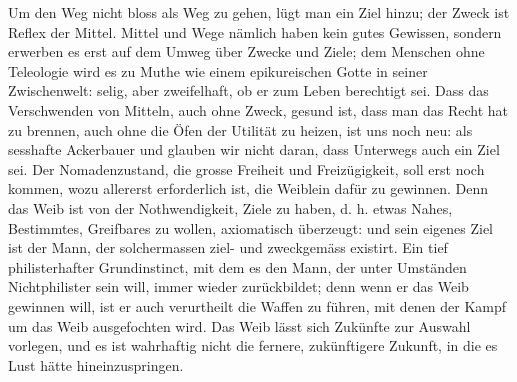 Um den Weg nicht bloss als Weg zu gehen, lügt man ein Ziel hinzu; der Zweck ist Reflex der Mittel. Mittel und Wege nämlich haben kein gutes Gewissen, sondern erwerben es erst auf dem Umweg über Zwecke und Ziele; dem Menschen ohne Teleologie wird es zu Muthe wie einem epikureischen Gotte in seiner Zwischenwelt: selig, aber zweifelhaft, ob er zum Leben berechtigt sei. Dass das Verschwenden von Mitteln, auch ohne Zweck, gesund ist, dass man das Recht hat zu brennen, auch ohne die Öfen der Utilität zu heizen, ist uns noch neu: als sesshafte Ackerbauer und  glauben wir nicht daran, dass Unterwegs auch ein Ziel sei. Der Nomadenzustand, die grosse Freiheit und Freizügigkeit, soll erst noch kommen, wozu allererst erforderlich ist, die Weiblein dafür zu gewinnen. Denn das Weib ist von der Nothwendigkeit, Ziele zu haben, d. h. etwas Nahes, Bestimmtes, Greifbares zu wollen, axiomatisch überzeugt: und sein eigenes Ziel ist der Mann, der solchermassen ziel- und zweckgemäss existirt. Ein tief philisterhafter Grundinstinct, mit dem es den Mann, der unter Umständen Nichtphilister sein will, immer wieder zurückbildet; denn wenn er das Weib gewinnen will, ist er auch verurtheilt die Waffen zu führen, mit denen der Kampf um das Weib ausgefochten wird. Das Weib lässt sich Zukünfte zur Auswahl vorlegen, und es ist wahrhaftig nicht die fernere, zukünftigere Zukunft, in die es Lust hätte hineinzuspringen.
\par

